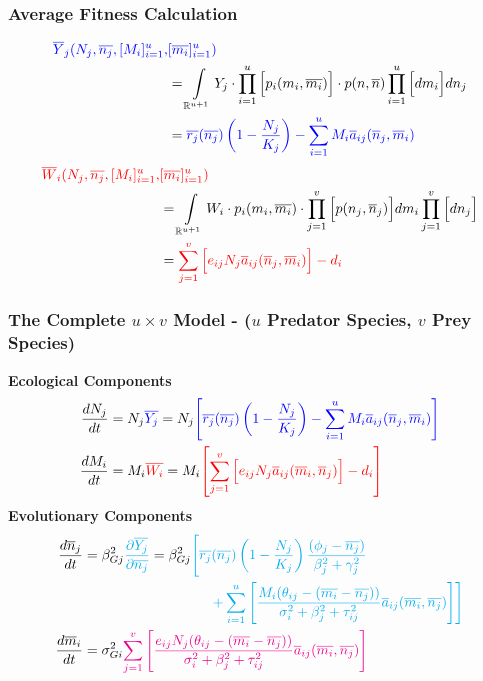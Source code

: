 \documentclass[10pt]{beamer}
\begin{document}
\begin{frame}
	\frametitle{Average Fitness Calculation}
	\begin{align*}
		{\color{blue}\overline{Y}_j(N_j, \overline{n_j}, [M_i]_{i=1}^{u}, }&{\color{blue}[\overline{m_i}]_{i=1}^{u})} \\
		&= \int\limits_{\mathbb{R}^{u+1}} Y_j \cdot \prod\limits_{i=1}^{u}\Big[p_i(m_i, \overline{m_i})\Big] \cdot p(n, \overline{n}) \prod\limits_{i=1}^{u}\Big[dm_i\Big] dn_j\\
		&= {\color{blue}\overline{r_j}(\overline{n_j})\left(1 - \frac{N_j}{K_j}\right) - \sum\limits_{i = 1}^{u}M_i\overline{a}_{ij}(\overline{n}_j, \overline{m}_i)}
	\end{align*}
	\begin{align*}
		{\color{red}\overline{W}_i(N_j, \overline{n_j}, [M_i]_{i=1}^{u}, }&{\color{red}[\overline{m_i}]_{i=1}^{u})} \\
		&= \int\limits_{\mathbb{R}^{u+1}} W_i \cdot p_i(m_i, \overline{m_i}) \cdot \prod\limits_{j=1}^{v}\Big[p(n_j, \overline{n}_j)\Big] dm_i \prod\limits_{j=1}^{v}\Big[dn_j\Big]\\
		&= {\color{red}\sum\limits_{j = 1}^{v}\Big[e_{ij}N_j\overline{a}_{ij}(\overline{n}_j, \overline{m}_i)\Big] - d_i}
	\end{align*}
\end{frame}
\begin{frame}
	\frametitle{The Complete $u\times v$ Model - \normalsize($u$ Predator Species, $v$ Prey Species)}
	{\bf Ecological Components}
	\begin{align*}
		\frac{dN_j}{dt} &= N_j{\color{blue}\overline{Y_j}} = N_j {\color{blue}\left[{\color{blue}\overline{r_j}(\overline{n_j})\left(1 - \frac{N_j}{K_j}\right) - \sum\limits_{i = 1}^{u}M_i\overline{a}_{ij}(\overline{n}_j, \overline{m}_i)}\right]} \\
		\frac{dM_i}{dt} &= M_i{\color{red}\overline{W_i}} = M_i {\color{red}\left[\sum\limits_{j = 1}^{v}\Big[e_{ij}N_j\overline{a}_{ij}(\overline{m}_i, \overline{n}_j)\Big] - d_i\right]}
	\end{align*}
	{\bf Evolutionary Components}
	\begin{align*}
		\frac{d\overline{n}_j}{dt} &= \beta_{Gj}^2{\color{cyan}\frac{\partial \overline{Y_j}}{\partial \overline{n_j}}} = \beta_{Gj}^2{\color{cyan}\left[\overline{r_j}(\overline{n_j})\left(1 - \frac{N_j}{K_j}\right)\frac{(\phi_j - \overline{n_j})}{\beta_j^2 + \gamma_j^2}\right.}
		\\&\hphantom{\text{mmmmmmmmmmm}}{\left.\color{cyan}+ \sum\limits_{i=1}^{u}\left[\frac{M_i(\theta_{ij} - (\overline{m_i} - \overline{n_j}))}{\sigma_i^2 + \beta_j^2 + \tau_{ij}^2} \overline{a}_{ij}(\overline{m_i}, \overline{n_j})\right]\right]}\\
		\frac{d\overline{m}_i}{dt} &= \sigma_{Gi}^2{\color{magenta}\sum\limits_{j=1}^{v}\left[\frac{e_{ij}N_j(\theta_{ij} - (\overline{m_i} - \overline{n_j}))}{\sigma_i^2 + \beta_j^2 + \tau_{ij}^2} \overline{a}_{ij}(\overline{m_i}, \overline{n_j})\right]}
	\end{align*}
\end{frame}
\end{document}
